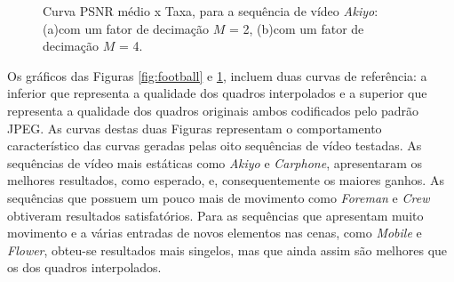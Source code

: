 \begin{figure}[H]
	\centering
	\caption{Curva PSNR médio x Taxa, para a sequência de vídeo \textit{Akiyo}: (a)com um fator de decimação $M$ = 2, (b)com um fator de decimação $M$ = 4.}
	\label{fig:akiyo}
\end{figure}

Os gráficos das Figuras \ref{fig:football} e \ref{fig:akiyo}, incluem duas curvas de referência: a inferior que representa a qualidade dos quadros interpolados e a superior que representa a qualidade dos quadros originais ambos codificados pelo padrão JPEG. As curvas destas duas Figuras representam o comportamento característico das curvas geradas pelas oito sequências de vídeo testadas. As sequências de vídeo mais estáticas como \textit{Akiyo} e \textit{Carphone}, apresentaram os melhores resultados, como esperado, e, consequentemente os maiores ganhos. As sequências que possuem um pouco mais de movimento como \textit{Foreman} e \textit{Crew} obtiveram resultados satisfatórios. Para as sequências que apresentam muito movimento e a várias entradas de novos elementos nas cenas, como \textit{Mobile} e \textit{Flower}, obteu-se resultados mais singelos, mas que ainda assim são melhores que os dos quadros interpolados.


